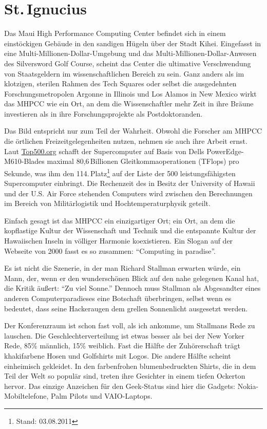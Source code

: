 \chapter{St.\,Ignucius}

Das Maui High Performance Computing Center befindet sich in einem einstöckigen Gebäude in den sandigen Hügeln über der Stadt Kihei. Eingefasst in eine Multi-Millionen-Dollar-Umgebung und das Multi-Millionen-Dollar-Anwesen des Silversword Golf Course, scheint das Center die ultimative Verschwendung von Staatsgeldern im wissenschaftlichen Bereich zu sein. Ganz anders als im klotzigen, sterilen Rahmen des Tech Squares oder selbst die ausgedehnten Forschungsmetropolen Argonne in Illinois und Los Alamos in New Mexico wirkt das MHPCC wie ein Ort, an dem die Wissenschaftler mehr Zeit in ihre Bräune investieren als in ihre Forschungsprojekte als Postdoktoranden.

Das Bild entspricht nur zum Teil der Wahrheit. Obwohl die Forscher am MHPCC die örtlichen Freizeitgelegenheiten nutzen, nehmen sie auch ihre Arbeit ernst. Laut \href{http://Top500.org}{Top500.org} schafft der Supercomputer auf Basis von Dells PowerEdge-M610-Blades maximal 80,6\,Billionen Gleitkommaoperationen (TFlops) pro Sekunde, was ihm den 114.\,Platz\footnote{Stand: 03.08.2011} auf der Liste der 500 leistungsfähigsten Supercomputer einbringt. Die Rechenzeit des in Besitz der University of Hawaii und der U.S. Air Force stehenden Computers wird zwischen den Berechnungen im Bereich von Militärlogistik und Hochtemperaturphysik geteilt.

Einfach gesagt ist das MHPCC ein einzigartiger Ort; ein Ort, an dem die kopflastige Kultur der Wissenschaft und Technik und die entspannte Kultur der Hawaiischen Inseln in völliger Harmonie koexistieren. Ein Slogan auf der Webseite von 2000 fasst es so zusammen: "`Computing in paradise"'.

Es ist nicht die Szenerie, in der man Richard Stallman erwarten würde, ein Mann, der, wenn er den wunderschönen Blick auf den nahe gelegenen Kanal hat, die Kritik äußert: "`Zu viel Sonne."' Dennoch muss Stallman als Abgesandter eines anderen Computerparadieses eine Botschaft überbringen, selbst wenn es bedeutet, dass seine Hackeraugen dem grellen Sonnenlicht ausgesetzt werden.

Der Konferenzraum ist schon fast voll, als ich ankomme, um Stallmans Rede zu lauschen. Die Geschlechterverteilung ist etwas besser als bei der New Yorker Rede, 85\% männlich, 15\% weiblich. Fast die Hälfte der Zuhörerschaft trägt khakifarbene Hosen und Golfshirts mit Logos. Die andere Hälfte scheint einheimisch gekleidet. In den farbenfrohen blumenbedruckten Shirts, die in dem Teil der Welt so populär sind, treten ihre Gesichter in einem tiefen Ockerton hervor. Das einzige Anzeichen für den Geek-Status sind hier die Gadgets: Nokia-Mobiltelefone, Palm Pilots und VAIO-Laptops.

